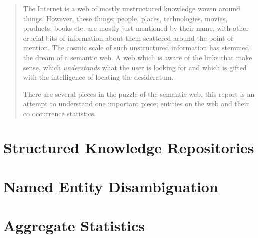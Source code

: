 \documentclass[a4paper,11pt]{report}
\begin{document}
\begin{abstract}
The Internet is a web of mostly unstructured knowledge woven around things. However, these things; people, places, technologies, movies, products, books
etc. are mostly just mentioned by their name, with other crucial bits of information about them scattered around the point of mention. The cosmic scale of 
such unstructured information has stemmed the dream of a semantic web. A web which is aware of the links that make sense, which \emph{understands} what the 
user is looking for and which is gifted with the intelligence of locating the desideratum.

There are several pieces in the puzzle of the semantic web, this report is an attempt to understand one important piece; entities on the web and
their co occurrence statistics.



\end{abstract}




\part{Structured Knowledge Repositories}


\part{Named Entity Disambiguation}




\part{Aggregate Statistics}






\end{document}
